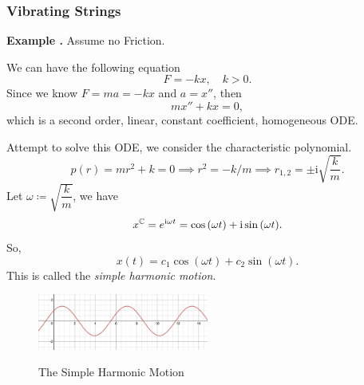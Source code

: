 \documentclass[12pt, a4paper]{article}
\newcounter{index}[subsection]
\newenvironment*{eg}{\begin{framed}\par\noindent\textbf{Example \thesubsection.\stepcounter{index}\theindex}}{\par\end{framed}}
\def\C{{\mathbb{C}}}
\def\i{{\mathrm{i}}}
\begin{document}
\subsubsection{Vibrating Strings}
\begin{eg}
	Assume no Friction. \par 
	We can have the following equation \[F=-kx,\quad k>0.\] Since we know $F=ma=-kx$ and $a=x''$, then \[mx''+kx=0,\] which is a second order, linear, constant coefficient, homogeneous ODE.\par 
	Attempt to solve this ODE, we consider the characteristic polynomial. \[p(r)=mr^2+k=0\implies r^2=-k/m\implies r_{1,2}=\pm\i\sqrt{\dfrac{k}{m}}.\] Let $\omega\coloneqq\sqrt{\dfrac{k}{m}}$, we have \[x^\C=e^{\i\omega t}=\cos\qty(\omega t)+\i\sin\qty(\omega t).\] So, \[x(t)=c_1\cos(\omega t)+c_2\sin(\omega t).\] This is called the \textit{simple harmonic motion}.
	\begin{figure}[H]
		\centering
		\includegraphics[width=0.5\textwidth]{fig/harmonicMotion}\label{harmonicMotion}
		\caption{The Simple Harmonic Motion}
	\end{figure}
\end{eg}
\end{document}

